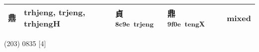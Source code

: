 \documentclass[14pt,a4paper]{scrartcl}
\begin{document}
\begin{longtable}[c]{@{}llllll@{}}
\begin{minipage}[t]{0.14\columnwidth}
鼎
\strut\end{minipage} &
\begin{minipage}[t]{0.14\columnwidth}\raggedright\strut
trhjeng, trjeng, trhjengH
\strut\end{minipage} &
\begin{minipage}[t]{0.14\columnwidth}\raggedright\strut
貞\textsuperscript{8c9e~trjeng}
\strut\end{minipage} &
\begin{minipage}[t]{0.14\columnwidth}\raggedright\strut
鼎\textsuperscript{9f0e~tengX}
\strut\end{minipage} &
\begin{minipage}[t]{0.14\columnwidth}\raggedright\strut
\strut\end{minipage} &
\begin{minipage}[t]{0.14\columnwidth}\raggedright\strut
mixed
\strut\end{minipage}\tabularnewline
\bottomrule
\end{longtable}

(203) 0835 {[}4{]}
\end{document}

